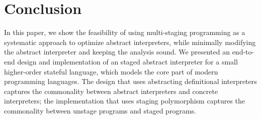 \section{Conclusion}

In this paper, we show the feasibility of using multi-staging programming as a systematic approach 
to optimize abstract interpreters, while minimally modifying the abstract interpreter and keeping
the analysis sound.
We presented an end-to-end design and implementation
of an staged abstract interpreter for a small higher-order stateful language, which 
models the core part of modern programming languages.
The design that uses abstracting definitional interpreters captures the commonality between
abstract interpreters and concrete interpreters; the implementation that uses staging polymorphism
captures the commonality between unstage programs and staged programs.
